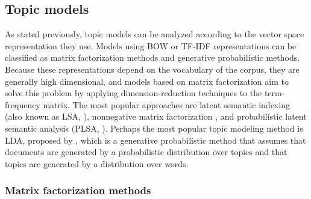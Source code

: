 \documentclass{article}
\begin{document}
\subsection{Topic models}

As stated previously, topic models can be analyzed according to the vector space representation they use. Models using BOW or TF-IDF representations can be classified as matrix factorization methods and generative probabilistic methods. Because these representations depend on the vocabulary of the corpus, they are generally high dimensional, and models based on matrix factorization aim to solve this problem by applying dimension-reduction techniques to the term-frequency matrix. The most popular approaches are latent semantic indexing (also known as LSA, \citep{Landauer1998}), nonnegative matrix factorization \citep{lee-NIPS2001}, and probabilistic latent semantic analysis (PLSA, \citep{Hofmann1999}). Perhaps the most popular topic modeling method is LDA, proposed by \cite{lda2003}, which is a generative probabilistic method that assumes that documents are generated by a probabilistic distribution over topics and that topics are generated by a distribution over words. 

\subsubsection{Matrix factorization methods}
\end{document}
